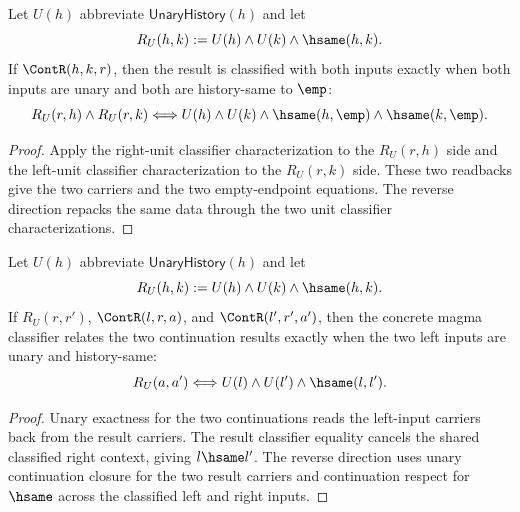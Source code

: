 \begin{theorem}
\label{thm:concrete-unary-history-magma-cont-result-both-inputs-classifier-empty}
Let $U(h)$ abbreviate $\mathsf{UnaryHistory}(h)$ and let
$$
R_U(h,k):=U(h)\land U(k)\land\hsame(h,k).
$$
If $\ContR(h,k,r)$, then the result is classified with both inputs exactly
when both inputs are unary and both are history-same to \(\emp\):
$$
R_U(r,h)\land R_U(r,k)
\Longleftrightarrow
U(h)\land U(k)\land \hsame(h,\emp)\land \hsame(k,\emp).
$$
\end{theorem}
\begin{proof}
Apply the right-unit classifier characterization to the \(R_U(r,h)\) side and
the left-unit classifier characterization to the \(R_U(r,k)\) side. These two
readbacks give the two carriers and the two empty-endpoint equations. The
reverse direction repacks the same data through the two unit classifier
characterizations.
\end{proof}

\begin{theorem}
\label{thm:concrete-unary-history-magma-right-context-classifier}
Let $U(h)$ abbreviate $\mathsf{UnaryHistory}(h)$ and let
$$
R_U(h,k):=U(h)\land U(k)\land\hsame(h,k).
$$
If $R_U(r,r')$, $\ContR(l,r,a)$, and $\ContR(l',r',a')$, then the concrete
magma classifier relates the two continuation results exactly when the two
left inputs are unary and history-same:
$$
R_U(a,a')
\Longleftrightarrow
U(l)\land U(l')\land\hsame(l,l').
$$
\end{theorem}
\begin{proof}
Unary exactness for the two continuations reads the left-input carriers back
from the result carriers. The result classifier equality cancels the shared
classified right context, giving $l\hsame l'$. The reverse direction uses unary
continuation closure for the two result carriers and continuation respect for
$\hsame$ across the classified left and right inputs.
\end{proof}

